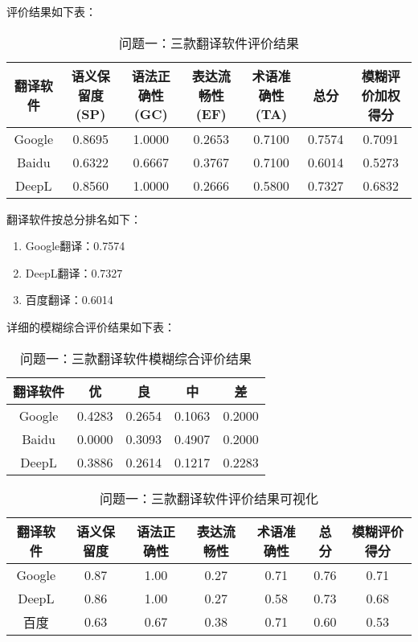 \documentclass[bwprint]{cumcmthesis}
\begin{document}
评价结果如下表：

\begin{table}[H]
\centering
\caption{问题一：三款翻译软件评价结果}
\begin{tabularx}{\textwidth}{CCCCCCC}
\toprule
翻译软件 & 语义保留度(SP) & 语法正确性(GC) & 表达流畅性(EF) & 术语准确性(TA) & 总分 & 模糊评价加权得分 \\
\midrule
Google & 0.8695 & 1.0000 & 0.2653 & 0.7100 & 0.7574 & 0.7091 \\
Baidu & 0.6322 & 0.6667 & 0.3767 & 0.7100 & 0.6014 & 0.5273 \\
DeepL & 0.8560 & 1.0000 & 0.2666 & 0.5800 & 0.7327 & 0.6832 \\
\bottomrule
\end{tabularx}
\label{tab:问题一评价结果}
\end{table}

翻译软件按总分排名如下：
\begin{enumerate}
    \item Google翻译：0.7574
    \item DeepL翻译：0.7327
    \item 百度翻译：0.6014
\end{enumerate}

详细的模糊综合评价结果如下表：

\begin{table}[H]
\centering
\caption{问题一：三款翻译软件模糊综合评价结果}
\begin{tabularx}{\textwidth}{CCCCC}
\toprule
翻译软件 & 优 & 良 & 中 & 差 \\
\midrule
Google & 0.4283 & 0.2654 & 0.1063 & 0.2000 \\
Baidu & 0.0000 & 0.3093 & 0.4907 & 0.2000 \\
DeepL & 0.3886 & 0.2614 & 0.1217 & 0.2283 \\
\bottomrule
\end{tabularx}
\label{tab:问题一模糊评价}
\end{table}

\begin{table}[H]
\centering
\caption{问题一：三款翻译软件评价结果可视化}
\begin{tabularx}{\textwidth}{CCCCCCC}
\toprule
翻译软件 & 语义保留度 & 语法正确性 & 表达流畅性 & 术语准确性 & 总分 & 模糊评价得分 \\
\midrule
Google & 0.87 & 1.00 & 0.27 & 0.71 & 0.76 & 0.71 \\
DeepL & 0.86 & 1.00 & 0.27 & 0.58 & 0.73 & 0.68 \\
百度 & 0.63 & 0.67 & 0.38 & 0.71 & 0.60 & 0.53 \\
\bottomrule
\end{tabularx}
\label{tab:问题一评价可视化}
\end{table}
\end{document}

